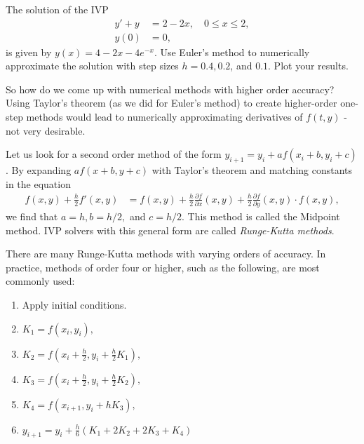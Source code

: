 \begin{problem} The solution of the IVP
\begin{align*}
y' + y &= 2-2x,\quad 0 \leq x \leq 2, \\
y(0) &= 0,
\end{align*}
is given by $y(x) = 4-2x -4e^{-x}$.
Use Euler's method to numerically approximate the solution with step sizes $h = 0.4, 0.2$, and $0.1.$ 
Plot your results.
\end{problem}

So how do we come up with numerical methods with higher order accuracy? 
Using Taylor's theorem (as we did for Euler's method) to create higher-order one-step methods would lead to numerically approximating derivatives of $f(t,y)$ - not very desirable.

Let us look for a second order method of the form $y_{i+1} = y_i + a f(x_i+b, y_i+c)$. 
By expanding $a f(x+b, y+c)$ with Taylor's theorem and matching constants in the equation
\begin{align*}
f(x,y) + \frac{h}{2}f'(x,y) &= f(x,y) + \frac{h}{2}\frac{\partial f}{\partial x}(x,y) + \frac{h}{2}\frac{\partial f}{\partial y}(x,y) \cdot f(x,y),
\end{align*}
we find that $a = h, b = h/2,$ and $c = h/2$. 
This method is called the Midpoint method. 
IVP solvers with this general form are called \textit{Runge-Kutta methods}. 

There are many Runge-Kutta methods with varying orders of accuracy. 
In practice, methods of order four or higher, such as the following, are most commonly used:
\begin{enumerate}
\item Apply initial conditions.
\item $K_1 = f(x_i,y_i),$
\item $K_2 = f(x_i + \frac{h}{2}, y_i + \frac{h}{2} K_1),$
\item $K_3 = f(x_i + \frac{h}{2} , y_i + \frac{h}{2} K_2),$
\item $K_4 = f(x_{i+1} , y_i + h K_3),$
\item $y_{i+1} = y_i + \frac{h}{6}(K_1 + 2K_2 + 2K_3 + K_4)$
\end{enumerate}

